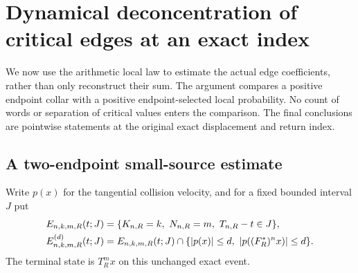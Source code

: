\section{Dynamical deconcentration of critical edges at an exact index}
\label{sec:v45-critical-deconcentration}
We now use the arithmetic local law to estimate the actual edge
coefficients, rather than only reconstruct their sum. The argument
compares a positive endpoint collar with a positive endpoint-selected
local probability. No count of words or separation of critical values
enters the comparison. The final conclusions are pointwise statements
at the original exact displacement and return index.

\subsection{A two-endpoint small-source estimate}
Write $p(x)$ for the tangential collision velocity, and for a fixed
bounded interval $J$ put
\begin{align}
 E_{n,k,m,R}(t;J)&=\{K_{n,R}=k,\ N_{n,R}=m,\ T_{n,R}-t\in J\},
                                                        \notag\\
 E^{(d)}_{n,k,m,R}(t;J)&=E_{n,k,m,R}(t;J)\cap
       \{|p(x)|\le d,\ |p((F_R^*)^n x)|\le d\}.
                                                        \label{eq:v45-strip-event}
\end{align}
The terminal state is $T_R^m x$ on this unchanged exact event.

